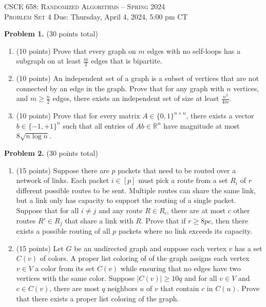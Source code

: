 \documentclass[11pt]{article}
\begin{document}
\begin{center}
{\Large\textsc{CSCE 658: Randomized Algorithms -- Spring 2024 \\ 
Problem Set 4}}
\vskip 0.1in
Due: Thursday, April 4, 2024, 5:00 pm CT
\end{center}

\noindent
\textbf{Problem 1.} (30 points total)
\begin{enumerate}
\item (10 points)
Prove that every graph on $m$ edges with no self-loops has a subgraph on at least $\frac{m}{2}$ edges that is bipartite.
\item (10 points)
An independent set of a graph is a subset of vertices that are not connected by an edge in the graph. 
Prove that for any graph with $n$ vertices, and $m\ge\frac{n}{2}$ edges, there exists an independent set of
size at least $\frac{n^2}{4m}$. 
\item (10 points)
Prove that for every matrix $A\in\{0,1\}^{n\times n}$, there exists a vector $b\in\{-1,+1\}^n$ such that all entries of $Ab\in\mathbb{R}^n$ have magnitude at most $8\sqrt{n\log n}$. 
\end{enumerate}

\vskip 0.2in\noindent
\textbf{Problem 2.} (30 points total)
\begin{enumerate}
\item (15 points)
Suppose there are $p$ packets that need to be routed over a network of links. 
Each packet $i\in[p]$ must pick a route from a set $R_i$ of $r$ different possible routes to be sent. 
Multiple routes can share the same link, but a link only has capacity to support the routing of a single packet. 
Suppose that for all $i\neq j$ and any route $R\in R_i$, there are at most $c$ other routes $R'\in R_j$ that share a link with $R$. 
Prove that if $r\ge 8pc$, then there exists a possible routing of all $p$ packets where no link exceeds its capacity.
\item (15 points)
Let $G$ be an undirected graph and suppose each vertex $v$ has a set $C(v)$ of colors. 
A proper list coloring of of the graph assigns each vertex $v\in V$ a color from its set $C(v)$ while ensuring that no edges have two vertices with the same color. 
Suppose $|C(v)|\ge 10q$ and for all $v\in V$ and $c\in C(v)$, there are most $q$ neighbors $u$ of $v$ that contain $c$ in $C(u)$. 
Prove that there exists a proper list coloring of the graph. 
\end{enumerate}
\end{document}
